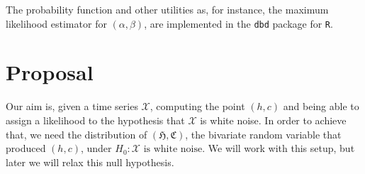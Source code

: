 \documentclass[12pt]{article}
\begin{document}
	The probability function and other utilities as, for instance, the maximum likelihood estimator for $(\alpha,\beta)$, are implemented in the \texttt{dbd} package for \texttt{R}.
	
	\section{Proposal}
	
	Our aim is, given a time series $\mathcal X$, computing the point $(h,c)$ and being able to assign a likelihood to the hypothesis that $\mathcal X$ is white noise.
	In order to achieve that, we need the distribution of $(\mathfrak{H},\mathfrak{C})$, the bivariate random  variable that produced $(h,c)$, under $H_0:\mathcal X\text { is white noise}$.
	We will work with this setup, but later we will relax this null hypothesis.
\end{document}
